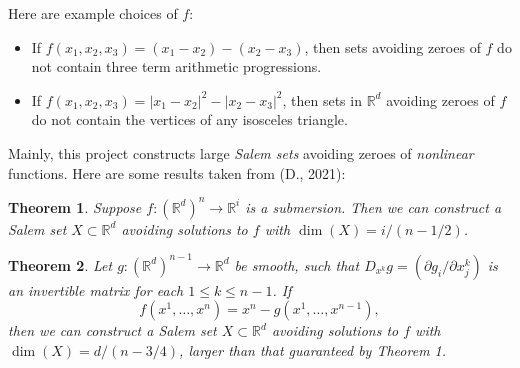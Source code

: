 \documentclass[12pt]{article}
\numberwithin{equation}{section}
\theoremstyle{plain}
\newtheorem{thm}{Theorem}
\theoremstyle{remark}
\begin{document}
{{\begin{multicols}{2}
\begin{figure}
\end{figure}

\large{ \vspace{0.2cm} Here are example choices of $f$:
%
\begin{itemize}
    \item If $f(x_1,x_2,x_3) = (x_1 - x_2) - (x_2 - x_3)$, then sets avoiding zeroes of $f$ do not contain three term arithmetic progressions.

    \item If $f(x_1,x_2,x_3) = |x_1 - x_2|^2 - |x_2 - x_3|^2$, then sets in $\mathbb{R}^d$ avoiding zeroes of $f$ do not contain the vertices of any isosceles triangle.
\end{itemize}

Mainly, this project constructs large \emph{Salem sets} avoiding zeroes of \emph{nonlinear} functions. Here are some results taken from (D., 2021):

\begin{thm}
    \hspace{-0.1cm} Suppose $f: (\mathbb{R}^d)^n \to \mathbb{R}^i$ is a submersion. Then we can construct a Salem set $X \subset \mathbb{R}^d$ avoiding solutions to $f$ with $\dim(X) = i / (n - 1/2)$.
\end{thm}

\begin{thm}
    Let $g: (\mathbb{R}^d)^{n-1} \to \mathbb{R}^d$ be smooth, such that $D_{x^k} g = (\partial g_i / \partial x^k_j)$ is an invertible matrix for each $1 \leq k \leq n-1$. If
    \[ f(x^1,\dots,x^n) = x^n - g(x^1,\dots,x^{n-1}), \]
    then we can construct a Salem set $X \subset \mathbb{R}^d$ avoiding solutions to $f$ with $\dim(X) = d / (n - 3/4)$, larger than that guaranteed by Theorem 1.
\end{thm}

}
\end{multicols}}}
\end{document}
